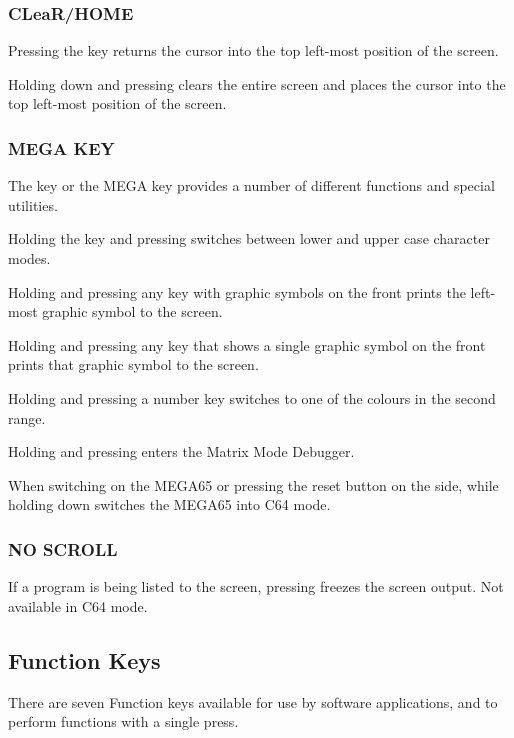 \subsubsection{CLeaR/HOME}

Pressing the  key returns the cursor into the top left-most position of the screen.

Holding down  and pressing  clears the entire screen and places the cursor into the top left-most position of the screen.

\subsubsection{MEGA KEY}

The \megasymbolkey key or the MEGA key provides a number of different functions and special utilities.

Holding the  key and pressing \megasymbolkey switches between lower and upper case character modes.

Holding \megasymbolkey and pressing any key with graphic symbols on the front prints the left-most graphic symbol to the screen.

Holding \megasymbolkey and pressing any key that shows a single graphic symbol on the front prints that graphic symbol to the screen.

Holding \megasymbolkey and pressing a number key switches to one of the colours in the second range.

Holding \megasymbolkey and pressing  enters the Matrix Mode Debugger.

When switching on the MEGA65 or pressing the reset button on the side, while holding down \megasymbolkey switches the MEGA65 into C64 mode.

\subsubsection{NO SCROLL}
If a program is being listed to the screen, pressing  freezes the screen output. Not available in C64 mode.


\subsection{Function Keys}

There are seven Function keys available for use by software applications,       and  to perform functions with a single press.

